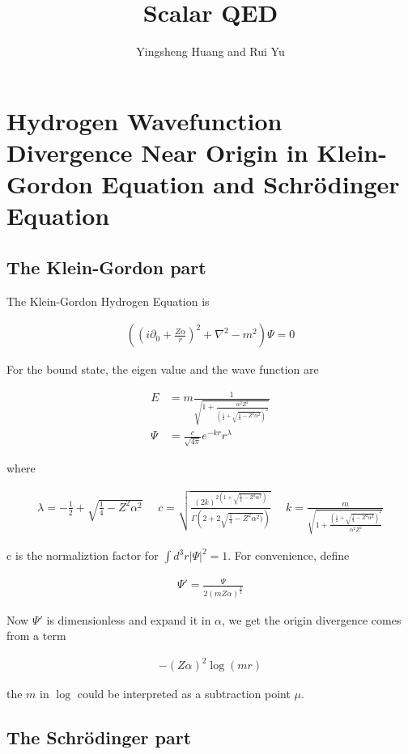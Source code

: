 \documentclass{article}
\title{Scalar QED}
\author{Yingsheng Huang and Rui Yu}
\begin{document}
\maketitle
\section{Hydrogen Wavefunction Divergence Near Origin in Klein-Gordon Equation and Schr\"odinger Equation}
\subsection{The Klein-Gordon part}
The Klein-Gordon Hydrogen Equation is

\begin{align}
	((i\partial_0+\frac{Z\alpha}{r})^2+\nabla^2-m^2)\Psi=0
\end{align}

For the bound state, the eigen value and the wave function are

\begin{align}
	E    & =m\frac{1}{\sqrt{1+\frac{\alpha^2 Z^2}{(\frac{1}{2}+\sqrt{\frac{1}{4}-Z^2\alpha^2})^2}}} \\
	\Psi & =\frac{c}{\sqrt{4\pi}}e^{-kr}r^\lambda
\end{align}

where

\begin{align}
	\lambda=-\frac{1}{2}+\sqrt{\frac{1}{4}-Z^2\alpha^2}\ \ \ \ \ \
	c=\sqrt{\frac{(2k)^{2(1+\sqrt{\frac{1}{4}-Z^2\alpha^2})}}{\Gamma(2+2\sqrt{\frac{1}{4}-Z^2\alpha^2)})}}\ \ \ \ \ \
	k=\frac{m}{\sqrt{1+\frac{(\frac{1}{2}+\sqrt{\frac{1}{4}-Z^2\alpha^2})^2}{\alpha^2Z^2}}}
\end{align}

c is the normaliztion factor for $\int d^3r|\Psi|^2=1$. For convenience, define

\begin{align}
	\Psi '=\frac{\Psi}{2(mZ\alpha)^\frac{3}{2}}
\end{align}

Now $\Psi '$ is dimensionless and expand it in $\alpha$, we get the origin divergence comes from a term

\begin{align}
	-(Z\alpha)^2\log(m r)
\end{align}

the $m$ in $\log$ could be interpreted as a subtraction point $\mu$.

\subsection{The Schr\"odinger part}
\end{document}
